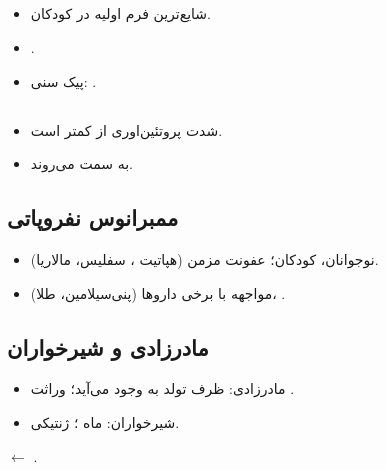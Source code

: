 \documentclass[11pt,a4paper]{article}
\begin{document}
\subsection*{}
\begin{itemize}
\item شایع‌ترین فرم  اولیه در کودکان.
\item {}.
\item پیک سنی: .
\end{itemize}

\subsection*{}
\begin{itemize}
\item شدت پروتئین‌اوری از  کمتر است.
\item {} به سمت  می‌روند.
\end{itemize}

\subsection*{ممبرانوس نفروپاتی}
\begin{itemize}
\item نوجوانان، کودکان؛ عفونت مزمن (هپاتیت ، سفلیس، مالاریا).
\item مواجهه با برخی داروها (پنی‌سیلامین، طلا)، .
\end{itemize}

\subsection*{ مادرزادی و شیرخواران}
\begin{itemize}
\item {} مادرزادی: ظرف  تولد به وجود می‌آید؛ وراثت .
\item {} شیرخواران: ماه ؛ ژنتیکی.
\end{itemize}

\medskip
\noindent
{}
\(\longleftarrow\)
.

\endgroup
\ifNephroticStandalone
  \expandafter\enddocument
\fi
\end{document}
